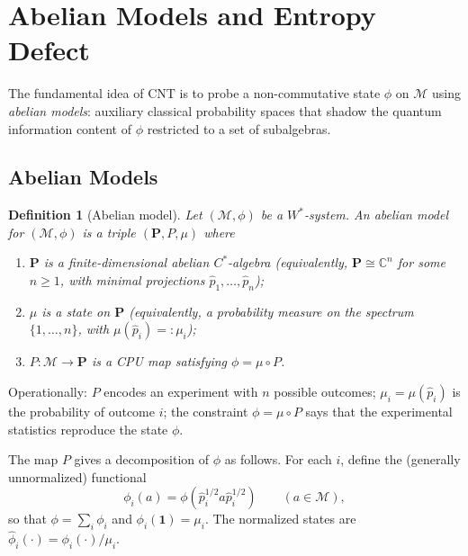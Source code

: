 \documentclass[12pt,a4paper]{article}
\newtheorem{definition}[theorem]{Definition}
\newcommand{\CC}{\mathbb{C}}
\newcommand{\id}{\mathbf{1}}  %
\newcommand{\vN}{\mathcal{M}}      %
\begin{document}
\section{Abelian Models and Entropy Defect}
\label{sec:abelian}

The fundamental idea of CNT is to probe a non-commutative state $\phi$ on $\vN$
using \emph{abelian models}: auxiliary classical probability spaces that shadow the
quantum information content of $\phi$ restricted to a set of subalgebras.

\subsection{Abelian Models}

\begin{definition}[Abelian model]\label{def:abelian_model}
Let $(\vN,\phi)$ be a $W^*$-system.  An \emph{abelian model} for $(\vN,\phi)$
is a triple $(\mathbf{P},P,\mu)$ where
\begin{enumerate}
\item[(a)] $\mathbf{P}$ is a finite-dimensional abelian $C^*$-algebra (equivalently,
  $\mathbf{P}\cong\CC^n$ for some $n\ge 1$, with minimal projections $\hat{p}_1,\ldots,\hat{p}_n$);
\item[(b)] $\mu$ is a state on $\mathbf{P}$ (equivalently, a probability measure on the
  spectrum $\{1,\ldots,n\}$, with $\mu(\hat{p}_i)=:\mu_i$);
\item[(c)] $P:\vN\to\mathbf{P}$ is a CPU map satisfying $\phi = \mu\circ P$.
\end{enumerate}
\end{definition}

Operationally: $P$ encodes an experiment with $n$ possible outcomes; $\mu_i=\mu(\hat{p}_i)$
is the probability of outcome $i$; the constraint $\phi=\mu\circ P$ says that the
experimental statistics reproduce the state $\phi$.

The map $P$ gives a decomposition of $\phi$ as follows.  For each $i$, define the
(generally unnormalized) functional
\begin{equation}\label{eq:phi_decomp}
  \phi_i(a) = \phi(\hat{p}_i^{1/2}a\hat{p}_i^{1/2})
  \qquad (a\in\vN),
\end{equation}
so that $\phi = \sum_i \phi_i$ and $\phi_i(\id)=\mu_i$.
The normalized states are $\hat\phi_i(\cdot) = \phi_i(\cdot)/\mu_i$.
\end{document}
